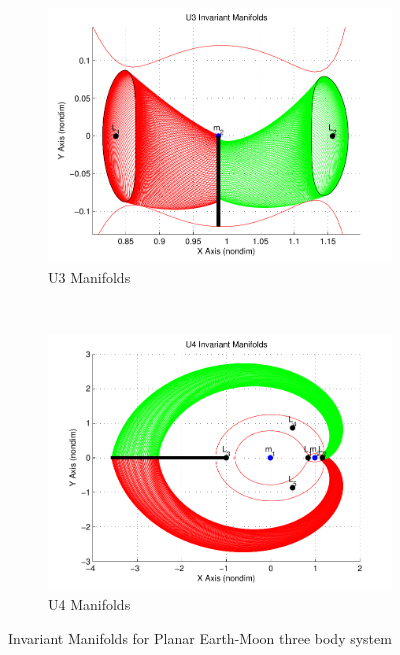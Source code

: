 \begin{figure}
        \begin{subfigure}[b]{0.5\textwidth}
                \includegraphics[width=\columnwidth]{figures/2015_SSPI/U3_Manifolds}
                \caption{U3 Manifolds}
                \label{fig:u3_manifolds}
        \end{subfigure}%
        ~%
        \begin{subfigure}[b]{0.5\textwidth}
                \includegraphics[width=\columnwidth]{figures/2015_SSPI/U4_Manifolds}
                \caption{U4 Manifolds}
                \label{fig:u4_manifolds}
        \end{subfigure}
        \caption{Invariant Manifolds for Planar Earth-Moon three body system}
	\label{fig:invariant_manifolds}
\end{figure}

